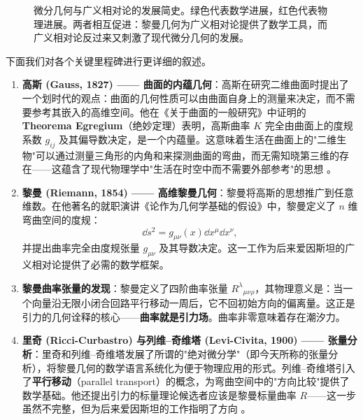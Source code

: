 \begin{figure}[htbp]
\caption{微分几何与广义相对论的发展简史。绿色代表数学进展，红色代表物理进展。两者相互促进：黎曼几何为广义相对论提供了数学工具，而广义相对论反过来又刺激了现代微分几何的发展。}
\label{fig:history_timeline}
\end{figure}

下面我们对各个关键里程碑进行更详细的叙述。

\begin{enumerate}
    \item \textbf{高斯 (Gauss, 1827) —— 曲面的内蕴几何}：高斯在研究二维曲面时提出了一个划时代的观点：曲面的几何性质可以由曲面自身上的测量来决定，而不需要参考其嵌入的高维空间。他在《关于曲面的一般研究》中证明的 \textbf{Theorema Egregium}（绝妙定理）表明，高斯曲率 $K$ 完全由曲面上的度规系数 $g_{ij}$ 及其偏导数决定，是一个内蕴量。这意味着生活在曲面上的"二维生物"可以通过测量三角形的内角和来探测曲面的弯曲，而无需知晓第三维的存在——这蕴含了现代物理学中"生活在时空中而不需要外部参考"的思想 \cite{Carroll1997}。
    
    \item \textbf{黎曼 (Riemann, 1854) —— 高维黎曼几何}：黎曼将高斯的思想推广到任意维数。在他著名的就职演讲《论作为几何学基础的假设》中，黎曼定义了 $n$ 维弯曲空间的度规：
    \begin{equation}
        \dd s^2 = g_{\mu\nu}(x) \dd x^\mu \dd x^\nu,
    \end{equation}
    并提出曲率完全由度规张量 $g_{\mu\nu}$ 及其导数决定。这一工作为后来爱因斯坦的广义相对论提供了必需的数学框架。
    
    \item \textbf{黎曼曲率张量的发现}：黎曼定义了四阶曲率张量 $R^\lambda{}_{\mu\nu\rho}$，其物理意义是：当一个向量沿无限小闭合回路平行移动一周后，它不回初始方向的偏离量。这正是引力的几何诠释的核心——\textbf{曲率就是引力场}。曲率非零意味着存在潮汐力。
    
    \item \textbf{里奇 (Ricci-Curbastro) 与列维--奇维塔 (Levi-Civita, 1900) —— 张量分析}：里奇和列维--奇维塔发展了所谓的"绝对微分学"（即今天所称的张量分析），将黎曼几何的数学语言系统化为便于物理应用的形式。列维--奇维塔引入了\textbf{平行移动}（parallel transport）的概念，为弯曲空间中的"方向比较"提供了数学基础。他还提出引力的标量理论候选者应该是黎曼标量曲率 $R$——这一步虽然不完整，但为后来爱因斯坦的工作指明了方向 \cite{Wald1984}。
    

\end{enumerate}
